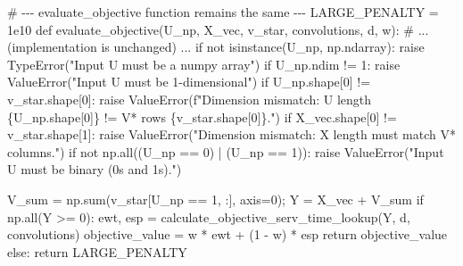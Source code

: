 \documentclass[
  letterpaper,
  DIV=11,
  numbers=noendperiod]{scrartcl}
\newenvironment{Shaded}{\begin{snugshade}}{\end{snugshade}}
\newcommand{\BuiltInTok}[1]{\textcolor[rgb]{0.00,0.23,0.31}{#1}}
\newcommand{\CommentTok}[1]{\textcolor[rgb]{0.37,0.37,0.37}{#1}}
\newcommand{\ControlFlowTok}[1]{\textcolor[rgb]{0.00,0.23,0.31}{#1}}
\newcommand{\DecValTok}[1]{\textcolor[rgb]{0.68,0.00,0.00}{#1}}
\newcommand{\FloatTok}[1]{\textcolor[rgb]{0.68,0.00,0.00}{#1}}
\newcommand{\KeywordTok}[1]{\textcolor[rgb]{0.00,0.23,0.31}{#1}}
\newcommand{\NormalTok}[1]{\textcolor[rgb]{0.00,0.23,0.31}{#1}}
\newcommand{\OperatorTok}[1]{\textcolor[rgb]{0.37,0.37,0.37}{#1}}
\newcommand{\PreprocessorTok}[1]{\textcolor[rgb]{0.68,0.00,0.00}{#1}}
\newcommand{\SpecialCharTok}[1]{\textcolor[rgb]{0.37,0.37,0.37}{#1}}
\newcommand{\SpecialStringTok}[1]{\textcolor[rgb]{0.13,0.47,0.30}{#1}}
\newcommand{\StringTok}[1]{\textcolor[rgb]{0.13,0.47,0.30}{#1}}
\begin{document}
\begin{Shaded}
\begin{Highlighting}[]
\CommentTok{\# {-}{-}{-} evaluate\_objective function remains the same {-}{-}{-}}
\NormalTok{LARGE\_PENALTY }\OperatorTok{=} \FloatTok{1e10}
\KeywordTok{def}\NormalTok{ evaluate\_objective(U\_np, X\_vec, v\_star, convolutions, d, w):}
    \CommentTok{\# ... (implementation is unchanged) ...}
    \ControlFlowTok{if} \KeywordTok{not} \BuiltInTok{isinstance}\NormalTok{(U\_np, np.ndarray): }\ControlFlowTok{raise} \PreprocessorTok{TypeError}\NormalTok{(}\StringTok{"Input U must be a numpy array"}\NormalTok{)}
    \ControlFlowTok{if}\NormalTok{ U\_np.ndim }\OperatorTok{!=} \DecValTok{1}\NormalTok{: }\ControlFlowTok{raise} \PreprocessorTok{ValueError}\NormalTok{(}\StringTok{"Input U must be 1{-}dimensional"}\NormalTok{)}
    \ControlFlowTok{if}\NormalTok{ U\_np.shape[}\DecValTok{0}\NormalTok{] }\OperatorTok{!=}\NormalTok{ v\_star.shape[}\DecValTok{0}\NormalTok{]: }\ControlFlowTok{raise} \PreprocessorTok{ValueError}\NormalTok{(}\SpecialStringTok{f"Dimension mismatch: U length }\SpecialCharTok{\{}\NormalTok{U\_np}\SpecialCharTok{.}\NormalTok{shape[}\DecValTok{0}\NormalTok{]}\SpecialCharTok{\}}\SpecialStringTok{ != V* rows }\SpecialCharTok{\{}\NormalTok{v\_star}\SpecialCharTok{.}\NormalTok{shape[}\DecValTok{0}\NormalTok{]}\SpecialCharTok{\}}\SpecialStringTok{."}\NormalTok{)}
    \ControlFlowTok{if}\NormalTok{ X\_vec.shape[}\DecValTok{0}\NormalTok{] }\OperatorTok{!=}\NormalTok{ v\_star.shape[}\DecValTok{1}\NormalTok{]: }\ControlFlowTok{raise} \PreprocessorTok{ValueError}\NormalTok{(}\StringTok{"Dimension mismatch: X length must match V* columns."}\NormalTok{)}
    \ControlFlowTok{if} \KeywordTok{not}\NormalTok{ np.}\BuiltInTok{all}\NormalTok{((U\_np }\OperatorTok{==} \DecValTok{0}\NormalTok{) }\OperatorTok{|}\NormalTok{ (U\_np }\OperatorTok{==} \DecValTok{1}\NormalTok{)): }\ControlFlowTok{raise} \PreprocessorTok{ValueError}\NormalTok{(}\StringTok{"Input U must be binary (0s and 1s)."}\NormalTok{)}

\NormalTok{    V\_sum }\OperatorTok{=}\NormalTok{ np.}\BuiltInTok{sum}\NormalTok{(v\_star[U\_np }\OperatorTok{==} \DecValTok{1}\NormalTok{, :], axis}\OperatorTok{=}\DecValTok{0}\NormalTok{)}\OperatorTok{;}\NormalTok{ Y }\OperatorTok{=}\NormalTok{ X\_vec }\OperatorTok{+}\NormalTok{ V\_sum}
    \ControlFlowTok{if}\NormalTok{ np.}\BuiltInTok{all}\NormalTok{(Y }\OperatorTok{\textgreater{}=} \DecValTok{0}\NormalTok{):}
\NormalTok{        ewt, esp }\OperatorTok{=}\NormalTok{ calculate\_objective\_serv\_time\_lookup(Y, d, convolutions)}
\NormalTok{        objective\_value }\OperatorTok{=}\NormalTok{ w }\OperatorTok{*}\NormalTok{ ewt }\OperatorTok{+}\NormalTok{ (}\DecValTok{1} \OperatorTok{{-}}\NormalTok{ w) }\OperatorTok{*}\NormalTok{ esp}
        \ControlFlowTok{return}\NormalTok{ objective\_value}
    \ControlFlowTok{else}\NormalTok{: }\ControlFlowTok{return}\NormalTok{ LARGE\_PENALTY}



\end{Highlighting}
\end{Shaded}
\end{document}
